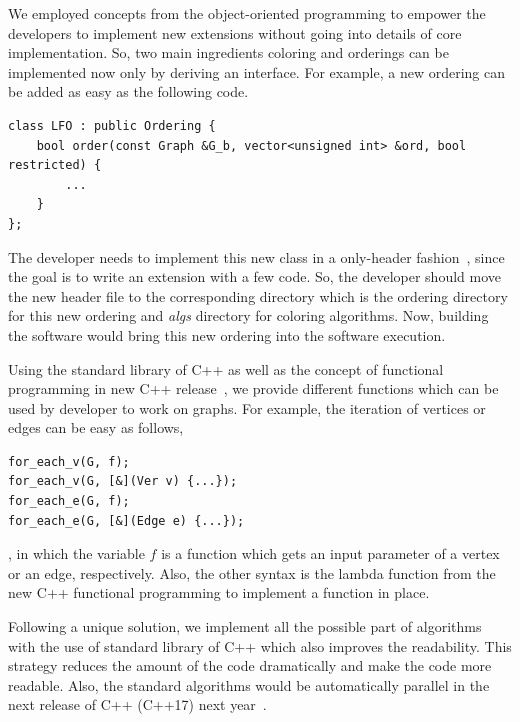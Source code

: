 \documentclass[12pt, oneside]{book}
\begin{document}
We employed concepts from the object-oriented programming to empower
the developers to implement new extensions without going into 
details of core implementation. So, two main ingredients coloring
and orderings can be implemented now only by deriving an interface.
For example, a new ordering can be added as easy as the following code.
\begin{lstlisting}
class LFO : public Ordering {
    bool order(const Graph &G_b, vector<unsigned int> &ord, bool restricted) {
        ...
    }
};
\end{lstlisting}
The developer needs to implement this new class in a only-header fashion~\cite{headeronly},
since the goal is to write an extension with a few code. So, the developer should
move the new header file to the corresponding directory which is the ordering directory
for this new ordering and \textit{algs} directory for coloring algorithms.
Now, building the software would bring this new ordering into the software execution.


Using the standard library of C++ as well as the concept of functional programming
in new C++ release~\cite{Sutherland2015}, we provide different functions which can be used
by developer to work on graphs. For example, the iteration of vertices
or edges can be easy as follows,
\begin{lstlisting}
for_each_v(G, f);
for_each_v(G, [&](Ver v) {...});
for_each_e(G, f);
for_each_e(G, [&](Edge e) {...});
\end{lstlisting}
, in which the variable $f$ is a function which gets an input parameter
of a vertex or an edge, respectively.
Also, the other syntax is the lambda function 
from the new C++ functional programming to implement a function in place.

Following a unique solution, we implement all the possible part of algorithms
with the use of standard library of C++ which also improves the readability.
This strategy reduces the amount of the code dramatically and
make the code more readable. 
Also, the standard algorithms would be automatically parallel in the next
release of C++ (C++17) next year~\cite{parallelcpp}.
\end{document}
